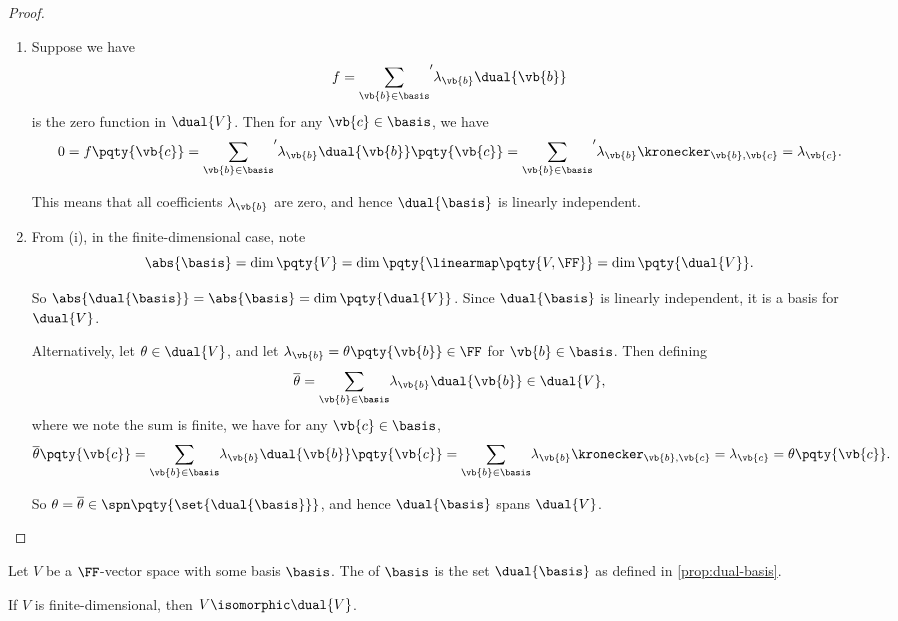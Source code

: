 \begin{proof}
    \begin{enumerate}
        \item Suppose we have
        \[
            f = {\sum_{\vb{b} \in \basis}}' \lambda_{\vb{b}} \dual{\vb{b}}
        \]
        is the zero function in \(\dual{V}\). Then for any \(\vb{c} \in \basis\), we have
        \[
            0 = f\pqty{\vb{c}} = {\sum_{\vb{b} \in \basis}}' \lambda_{\vb{b}} \dual{\vb{b}}\pqty{\vb{c}} = {\sum_{\vb{b} \in \basis}}' \lambda_{\vb{b}} \kronecker_{\vb{b}, \vb{c}} = \lambda_{\vb{c}}.
        \]

        This means that all coefficients \(\lambda_{\vb{b}}\) are zero, and hence \(\dual{\basis}\) is linearly independent.

        \item From (i), in the finite-dimensional case, note
        \[
            \abs{\basis} = \dim \pqty{V} = \dim \pqty{\linearmap\pqty{V, \FF}} = \dim \pqty{\dual{V}}.
        \]

        So \(\abs{\dual{\basis}} = \abs{\basis} = \dim \pqty{\dual{V}}\). Since \(\dual{\basis}\) is linearly independent, it is a basis for \(\dual{V}\).

        Alternatively, let \(\theta \in \dual{V}\), and let \(\lambda_{\vb{b}} = \theta\pqty{\vb{b}} \in \FF\) for \(\vb{b} \in \basis\). Then defining
        \[
            \overline{\theta} = {\sum_{\vb{b} \in \basis}} \lambda_{\vb{b}} \dual{\vb{b}} \in \dual{V},
        \]
        where we note the sum is finite, we have for any \(\vb{c} \in \basis\),
        \[
            \overline{\theta}\pqty{\vb{c}} = {\sum_{\vb{b} \in \basis}} \lambda_{\vb{b}} \dual{\vb{b}}\pqty{\vb{c}} = {\sum_{\vb{b} \in \basis}} \lambda_{\vb{b}} \kronecker_{\vb{b}, \vb{c}} = \lambda_{\vb{c}} = \theta\pqty{\vb{c}}.
        \]

        So \(\theta = \overline{\theta} \in \spn\pqty{\set{\dual{\basis}}}\), and hence \(\dual{\basis}\) spans \(\dual{V}\).
    \end{enumerate}
\end{proof}

\begin{definition}
    Let \(V\) be a \(\FF\)-vector space with some basis \(\basis\). The  of \(\basis\) is the set \(\dual{\basis}\) as defined in \autoref{prop:dual-basis}.
\end{definition}

\begin{corollary}
    If \(V\) is finite-dimensional, then \(V \isomorphic \dual{V}\).
\end{corollary}


